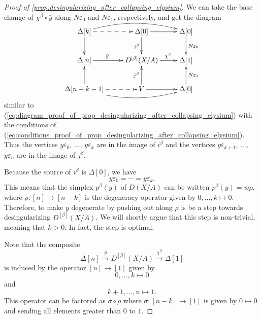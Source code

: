 \begin{proof}[Proof of \cref{prop:desingularizing_after_collapsing_elysium}]
We can take the base change of $\chi ^\beta \circ \bar{y}$ along $N\varepsilon _0$ and $N\varepsilon _1$, respectively, and get the diagram
\begin{equation}
\label{eq:diagram_proof_of_prop_desingularizing_after_collapsing_elysium_special}
\begin{gathered}
\xymatrix{
\Delta [k] \ar[d] \ar@{-->}[r] \ar@/^1pc/[rr] & \Delta [0] \ar[d]_{i^\beta } \ar[r] & \Delta [0] \ar[d]^{N\varepsilon _0} \\
\Delta [n] \ar[r]^(.4){\bar{y} } & D^{[\beta ]}(X/A) \ar[r]^(.6){\chi ^\beta } & \Delta [1] \\
\Delta [n-k-1] \ar[u] \ar@/_1pc/[rr] \ar@{-->}[r] & V \ar[u]^{j^\beta } \ar[r] & \Delta [0] \ar[u]_{N\varepsilon _1}
}
\end{gathered}
\end{equation}
similar to (\ref{eq:diagram_proof_of_prop_desingularizing_after_collapsing_elysium}) with the conditions of (\ref{eq:conditions_proof_of_prop_desingularizing_after_collapsing_elysium}). Thus the vertices $y\varepsilon _0$, $\dots$, $y\varepsilon _k$ are in the image of $i^\beta$ and the vertices $y\varepsilon _{k+1}$, $\dots$, $y\varepsilon _n$ are in the image of $j^\beta$.

Because the source of $i^\beta$ is $\Delta [0]$, we have
\[y\varepsilon _0=\cdots =y\varepsilon _k.\]
This means that the simplex $p^\beta (y)$ of $D(X/A)$ can be written $p^\beta (y)=w\rho$, where $\rho :[n]\to [n-k]$ is the degeneracy operator given by $0,\dots ,k\mapsto 0$. Therefore, to make $y$ degenerate by pushing out along $\rho$ is be a step towards desingularizing $D^{[\beta ]}(X/A)$. We will shortly argue that this step is non-trivial, meaning that $k>0$. In fact, the step is optimal.

Note that the composite
\[\Delta [n]\xrightarrow{\bar{y} } D^{[\beta ]}(X/A)\xrightarrow{\chi ^\beta } \Delta [1]\]
is induced by the operator $[n]\to [1]$ given by
\[0,\dots ,k\mapsto 0\]
and
\[k+1,\dots ,n\mapsto 1.\]
This operator can be factored as $\sigma \circ \rho$ where $\sigma :[n-k]\to [1]$ is given by $0\mapsto 0$ and sending all elements greater than $0$ to $1$.


\end{proof}
